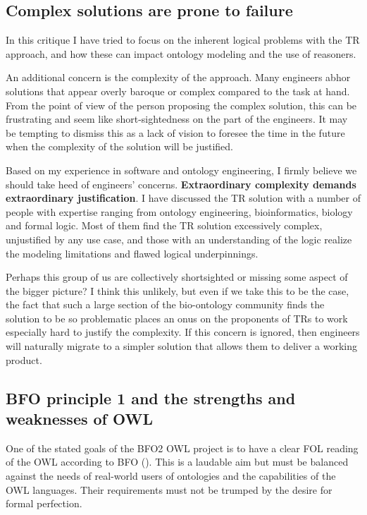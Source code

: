 \documentclass{bioinfo}
\def\P1{\pr{P-1}}
\begin{document}
\subsection{Complex solutions are prone to failure}

In this critique I have tried to focus on the inherent logical
problems with the TR approach, and how these can impact ontology
modeling and the use of reasoners.

An additional concern is the complexity of the approach. Many
engineers abhor solutions that appear overly baroque or complex
compared to the task at hand. From the point of view of the person
proposing the complex solution, this can be frustrating and seem like
short-sightedness on the part of the engineers. It may be tempting to
dismiss this as a lack of vision to foresee the time in the future
when the complexity of the solution will be justified.

Based on my experience in software and ontology engineering, I firmly
believe we should take heed of engineers'
concerns. \textbf{Extraordinary complexity demands extraordinary
  justification}.  I have discussed the TR solution with a number of
people with expertise ranging from ontology engineering,
bioinformatics, biology and formal logic. Most of them find the TR
solution excessively complex, unjustified by any use case, and those
with an understanding of the logic realize the modeling limitations
and flawed logical underpinnings.

Perhaps this group of us are collectively shortsighted or missing some
aspect of the bigger picture? I think this unlikely, but even if we
take this to be the case, the fact that such a large section of the
bio-ontology community finds the solution to be so problematic places
an onus on the proponents of TRs to work especially hard to justify
the complexity. If this concern is ignored, then engineers will
naturally migrate to a simpler solution that allows them to deliver a
working product.

\subsection{BFO principle 1 and the strengths and weaknesses of OWL}

One of the stated goals of the BFO2 OWL project is to have a clear FOL
reading of the OWL according to BFO (\P1). This is a laudable aim but
must be balanced against the needs of real-world users of ontologies
and the capabilities of the OWL languages. Their requirements must
not be trumped by the desire for formal perfection.
\end{document}
